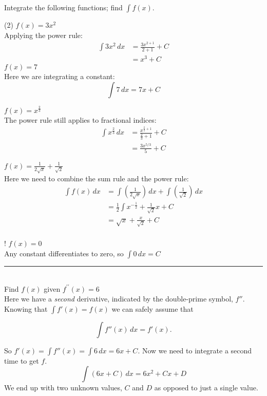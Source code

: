 \clearpage
\example Integrate the following functions; find $\displaystyle\int f(x)$.
\begin{tasks}(2)
	\task $f(x) =3x^{2}$ \medskip\\
	\solution Applying the power rule:\\
\begin{align*}\int 3x^{2}\,dx&=\frac{3x^{2+1}}{2+1}+C\\
	&=x^3+C\end{align*}
\task $f (x) =7$ \medskip \\
\solution Here we are integrating a constant:\\
\[\int 7\,dx=7x+C\]

\task $f(x) =x^{\frac{2}{3}}$ \medskip\\
\solution The power rule still applies to fractional indices:\\
\begin{align*}\int x^{\frac{2}{3}}\,dx&=\frac{x^{\frac{2}{3}+1}}{\frac{2}{3}+1}+C\\
&=\frac{3 x^{5/3}}{5}+C \end{align*}

\task $f (x) =\frac{1}{2 \sqrt{x}} +\frac{1}{\sqrt{2}}$ \medskip\\
\solution Here we need to combine the sum rule and the power rule:\\
\begin{align*}
\int f(x)\,dx &= \int(\frac{1}{2 \sqrt{x}}) \,dx+\int(\frac{1}{\sqrt{2}}) \,dx\\
&=\frac{1}{2}\int x^{-\frac{1}{2}}+\frac{1}{\sqrt{2}}x+C\\
&=\sqrt{x}+\frac{x}{\sqrt{2}}+C\\
\end{align*}

\task! $f(x)=0$\medskip\\
\solution Any constant differentiates to zero, so $\int 0\, dx=C$
\end{tasks}

\rule{6.8cm}{0.5pt}\\
\example Find $f (x)$ given $f^{ \prime  \prime } (x) =6$\medskip\\
\solution Here we have a \textit{second} derivative, indicated by the double-prime symbol, $f''$. Knowing that $\int f'(x)=f(x)$ we can safely assume that 
\begin{tcolorbox}
	\[\int f''(x) \,dx = f'(x).\]
\end{tcolorbox}
So $f'(x)=\int f''(x) = \int 6 \,dx = 6x+C$. Now we need to integrate a second time to get $f$.
\[\int (6x+C)\,dx=6x^2+Cx+D\]
We end up with two unknown values, $C$ and $D$ as opposed to just a single value.

